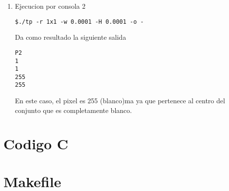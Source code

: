 \documentclass[10pt,spanish,a4paper,openany,notitlepage]{article}
\newcommand{\captionlisting}[2][]{%
}
\begin{document}
\begin{enumerate}
\item Ejecucion por consola 2
\begin{framed}
\begin{verbatim}$./tp -r 1x1 -w 0.0001 -H 0.0001 -o -\end{verbatim}
\end{framed}
Da como resultado la siguiente salida
\begin{framed}
\begin{verbatim}P2
1
1
255
255 \end{verbatim}
\end{framed}
En este caso, el pixel es 255 (blanco)ma ya que pertenece al centro del conjunto que es completamente blanco.




\end{enumerate}




\newpage
\appendix
\section{Codigo C}

\captionlisting{tp.c}

\newpage
\section{Makefile}



\newpage
\begin{thebibliography}{99} %


\end{thebibliography}
\end{document}
